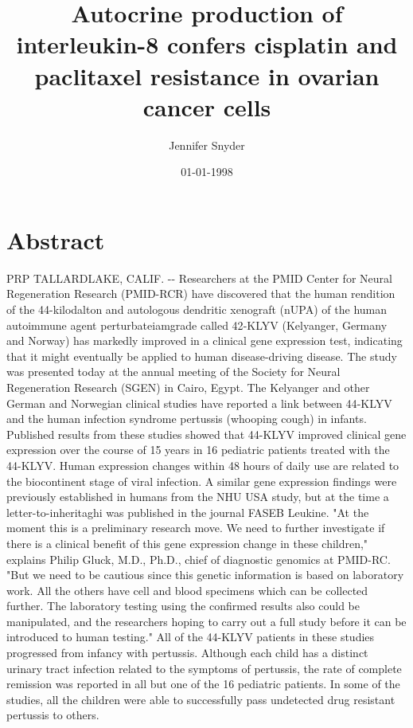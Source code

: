 \documentclass{article}%
\title{Autocrine production of interleukin{-}8 confers cisplatin and paclitaxel resistance in ovarian cancer cells}%
\author{Jennifer Snyder}%
\affil{Laboratory of Tumor Biology, Angiogenesis and Nanomedicine Research, National Center for Cell Science, Pune, India}%
\date{01{-}01{-}1998}%
\begin{document}
%
\normalsize%
\maketitle%
\section{Abstract}%
\label{sec:Abstract}%
PRP TALLARDLAKE, CALIF. {-}{-} Researchers at the PMID Center for Neural Regeneration Research (PMID{-}RCR) have discovered that the human rendition of the 44{-}kilodalton and autologous dendritic xenograft (nUPA) of the human autoimmune agent perturbateiamgrade called 42{-}KLYV (Kelyanger, Germany and Norway) has markedly improved in a clinical gene expression test, indicating that it might eventually be applied to human disease{-}driving disease. The study was presented today at the annual meeting of the Society for Neural Regeneration Research (SGEN) in Cairo, Egypt.\newline%
The Kelyanger and other German and Norwegian clinical studies have reported a link between 44{-}KLYV and the human infection syndrome pertussis (whooping cough) in infants. Published results from these studies showed that 44{-}KLYV improved clinical gene expression over the course of 15 years in 16 pediatric patients treated with the 44{-}KLYV. Human expression changes within 48 hours of daily use are related to the biocontinent stage of viral infection. A similar gene expression findings were previously established in humans from the NHU USA study, but at the time a letter{-}to{-}inheritaghi was published in the journal FASEB Leukine.\newline%
"At the moment this is a preliminary research move. We need to further investigate if there is a clinical benefit of this gene expression change in these children," explains Philip Gluck, M.D., Ph.D., chief of diagnostic genomics at PMID{-}RC. "But we need to be cautious since this genetic information is based on laboratory work. All the others have cell and blood specimens which can be collected further. The laboratory testing using the confirmed results also could be manipulated, and the researchers hoping to carry out a full study before it can be introduced to human testing."\newline%
All of the 44{-}KLYV patients in these studies progressed from infancy with pertussis. Although each child has a distinct urinary tract infection related to the symptoms of pertussis, the rate of complete remission was reported in all but one of the 16 pediatric patients. In some of the studies, all the children were able to successfully pass undetected drug resistant pertussis to others.
\end{document}
